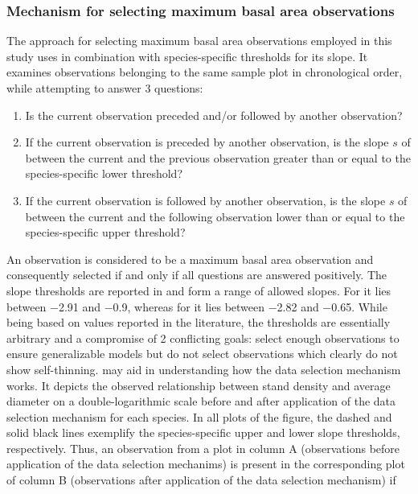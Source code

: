\subsubsection{Mechanism for selecting maximum basal area observations}

The approach for selecting maximum basal area observations employed in this study uses  in combination with species-specific thresholds for its slope.  It examines observations belonging to the same sample plot in chronological order, while attempting to answer 3 questions:
\begin{enumerate}
\item Is the current observation preceded and/or followed by another observation?
\item If the current observation is preceded by another observation, is the slope \(s\) of  between the current and the previous observation greater than or equal to the species-specific lower threshold?
\item If the current observation is followed by another observation, is the slope \(s\) of  between the current and the following observation lower than or equal to the species-specific upper threshold?
\end{enumerate}
An observation is considered to be a maximum basal area observation and consequently selected if and only if all questions are answered positively.  The slope thresholds are reported in  and form a range of allowed slopes.  For \Beech{} it lies between \num{-2.91} and \num{-0.9}, whereas for \Spruce{} it lies between \num{-2.82} and \num{-0.65}.  While being based on values reported in the literature, the thresholds are essentially arbitrary and a compromise of 2 conflicting goals: select enough observations to ensure generalizable models but do not select observations which clearly do not show self-thinning.
 may aid in understanding how the data selection mechanism works.  It depicts the observed relationship between stand density and average diameter on a double-logarithmic scale before and after application of the data selection mechanism for each species.  In all plots of the figure, the dashed and solid black lines exemplify the species-specific upper and lower slope thresholds, respectively.  Thus, an observation from a plot in column A (observations before application of the data selection mechanims) is present in the corresponding plot of column B (observations after application of the data selection mechanism) if
